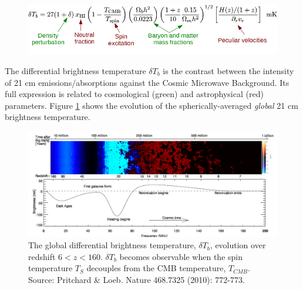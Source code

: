 \documentclass[a0,landscape]{a0poster}
\begin{document}
\begin{multicols}{4}
\begin{figure}[H]
\centering
\includegraphics[scale=1]{figures/differential_brightness.png}
\end{figure}

The differential brightness temperature $\delta T_b$ is the contrast between the intensity of 21 cm emissions/absorptions against the Cosmic Microwave Background. Its full expression is related to cosmological (green) and astrophysical (red) parameters. Figure \ref{global} shows the evolution of the spherically-averaged \emph{global} 21 cm brightness temperature.

\begin{figure}[H]
\centering
\includegraphics[width=1.0\linewidth]{figures/global_history.png}
\caption{The global differential brightness temperature, $\delta T_b$, evolution over redshift $6<z<160$. $\delta T_b$ becomes observable when the spin temperature $T_S$ decouples from the CMB temperature, $T_{CMB}$. Source: Pritchard \& Loeb. Nature 468.7325 (2010): 772-773. }\label{global}
\end{figure}



\end{multicols}
\end{document}
